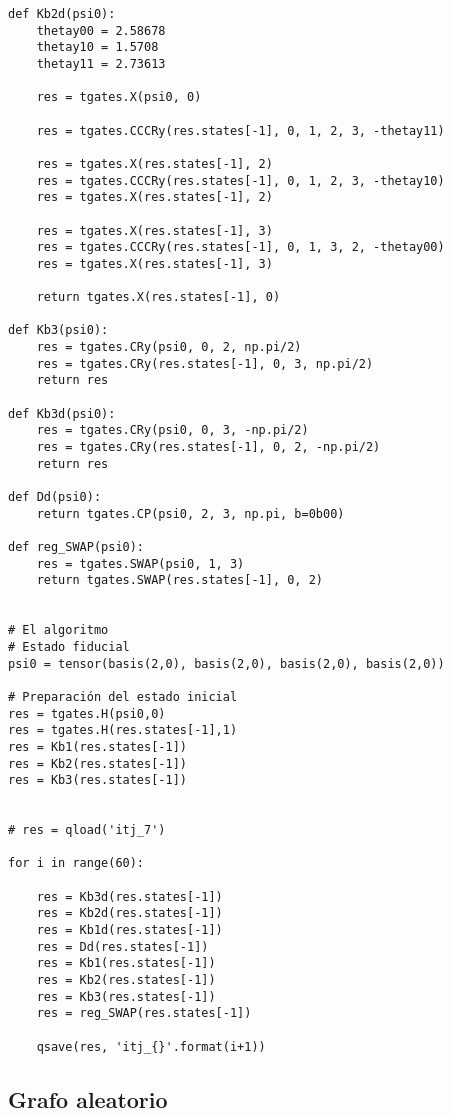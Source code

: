 \begin{verbatim}
def Kb2d(psi0):
    thetay00 = 2.58678
    thetay10 = 1.5708
    thetay11 = 2.73613

    res = tgates.X(psi0, 0)

    res = tgates.CCCRy(res.states[-1], 0, 1, 2, 3, -thetay11)

    res = tgates.X(res.states[-1], 2)
    res = tgates.CCCRy(res.states[-1], 0, 1, 2, 3, -thetay10)
    res = tgates.X(res.states[-1], 2)

    res = tgates.X(res.states[-1], 3)
    res = tgates.CCCRy(res.states[-1], 0, 1, 3, 2, -thetay00)
    res = tgates.X(res.states[-1], 3)

    return tgates.X(res.states[-1], 0)

def Kb3(psi0):
    res = tgates.CRy(psi0, 0, 2, np.pi/2)
    res = tgates.CRy(res.states[-1], 0, 3, np.pi/2)
    return res

def Kb3d(psi0):
    res = tgates.CRy(psi0, 0, 3, -np.pi/2)
    res = tgates.CRy(res.states[-1], 0, 2, -np.pi/2)
    return res

def Dd(psi0):
    return tgates.CP(psi0, 2, 3, np.pi, b=0b00)

def reg_SWAP(psi0):
    res = tgates.SWAP(psi0, 1, 3)
    return tgates.SWAP(res.states[-1], 0, 2)


# El algoritmo
# Estado fiducial
psi0 = tensor(basis(2,0), basis(2,0), basis(2,0), basis(2,0))

# Preparación del estado inicial
res = tgates.H(psi0,0)
res = tgates.H(res.states[-1],1)
res = Kb1(res.states[-1])
res = Kb2(res.states[-1])
res = Kb3(res.states[-1])


# res = qload('itj_7')

for i in range(60):
    
    res = Kb3d(res.states[-1])
    res = Kb2d(res.states[-1])
    res = Kb1d(res.states[-1])
    res = Dd(res.states[-1])
    res = Kb1(res.states[-1])
    res = Kb2(res.states[-1])
    res = Kb3(res.states[-1])
    res = reg_SWAP(res.states[-1])
    
    qsave(res, 'itj_{}'.format(i+1))

\end{verbatim}

\subsection{Grafo aleatorio}

